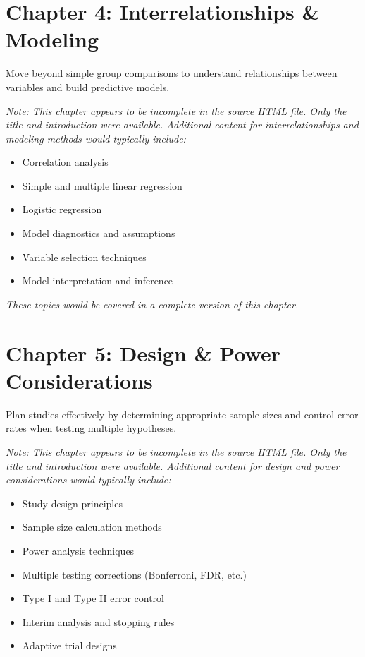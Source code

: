 \documentclass[
  11pt,
  letterpaper,
  oneside]{book}
\providecommand{\tightlist}{%
  \setlength{\itemsep}{0pt}\setlength{\parskip}{0pt}}\usepackage{longtable,booktabs,array}
\begin{document}

\chapter{Chapter 4: Interrelationships \&
Modeling}\label{chapter-4-interrelationships-modeling}

Move beyond simple group comparisons to understand relationships between
variables and build predictive models.

\emph{Note: This chapter appears to be incomplete in the source HTML
file. Only the title and introduction were available. Additional content
for interrelationships and modeling methods would typically include:}

\begin{itemize}
\tightlist
\item
  Correlation analysis
\item
  Simple and multiple linear regression
\item
  Logistic regression
\item
  Model diagnostics and assumptions
\item
  Variable selection techniques
\item
  Model interpretation and inference
\end{itemize}

\emph{These topics would be covered in a complete version of this
chapter.}


\chapter{Chapter 5: Design \& Power
Considerations}\label{chapter-5-design-power-considerations}

Plan studies effectively by determining appropriate sample sizes and
control error rates when testing multiple hypotheses.

\emph{Note: This chapter appears to be incomplete in the source HTML
file. Only the title and introduction were available. Additional content
for design and power considerations would typically include:}

\begin{itemize}
\tightlist
\item
  Study design principles
\item
  Sample size calculation methods
\item
  Power analysis techniques
\item
  Multiple testing corrections (Bonferroni, FDR, etc.)
\item
  Type I and Type II error control
\item
  Interim analysis and stopping rules
\item
  Adaptive trial designs
\end{itemize}
\end{document}
